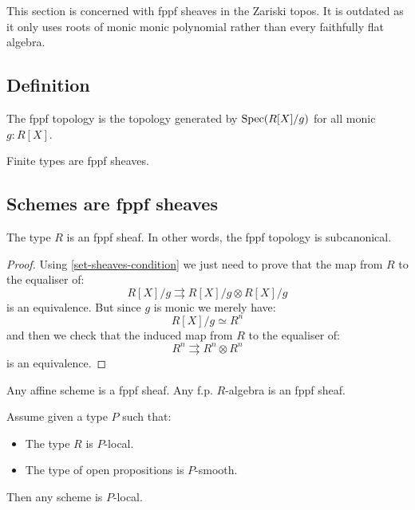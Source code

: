 This section is concerned with fppf sheaves in the Zariski topos. It is outdated as it only uses roots of monic monic polynomial rather than every faithfully flat algebra.

\subsection{Definition}

\begin{definition}
The fppf topology is the topology generated by $\operatorname{Spec}(R[X]/g)$ for all monic $g:R[X]$.
\end{definition}

\begin{example}
Finite types are fppf sheaves.
\end{example}

\subsection{Schemes are fppf sheaves}

\begin{lemma}\label{fppf-subcanonical}
The type $R$ is an fppf sheaf. In other words, the fppf topology is subcanonical.
\end{lemma}

\begin{proof}
Using \cref{set-sheaves-condition} we just need to prove that the map from $R$ to the equaliser of:
\[R[X]/g \rightrightarrows R[X]/g \otimes R[X]/g\]
is an equivalence. But since $g$ is monic we merely have:
\[R[X]/g \simeq R^n\]
and then we check that the induced map from $R$ to the equaliser of:
\[R^n \rightrightarrows R^n\otimes R^n\]
is an equivalence.
\end{proof}

\begin{corollary}
Any affine scheme is a fppf sheaf. Any f.p. $R$-algebra is an fppf sheaf.
\end{corollary}

\begin{lemma}\label{scheme-are-sheaf-from-affine}
Assume given a type $P$ such that:
\begin{itemize}
\item The type $R$ is $P$-local.
\item The type of open propositions is $P$-smooth.
\end{itemize}
Then any scheme is $P$-local.
\end{lemma}


